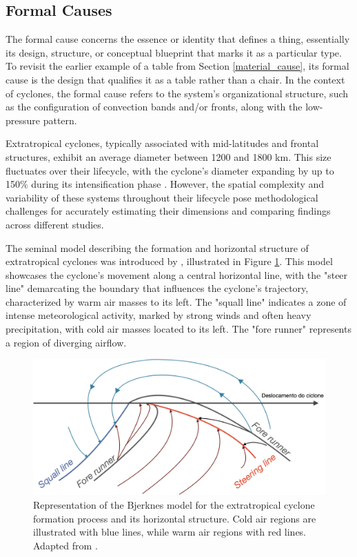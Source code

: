 \subsection{Formal Causes}\label{formal_cause}

The formal cause concerns the essence or identity that defines a thing, essentially its design, structure, or conceptual blueprint that marks it as a particular type. To revisit the earlier example of a table from Section \ref{material_cause}, its formal cause is the design that qualifies it as a table rather than a chair. In the context of cyclones, the formal cause refers to the system's organizational structure, such as the configuration of convection bands and/or fronts, along with the low-pressure pattern.

Extratropical cyclones, typically associated with mid-latitudes and frontal structures, exhibit an average diameter between 1200 and 1800 km. This size fluctuates over their lifecycle, with the cyclone's diameter expanding by up to 150\% during its intensification phase \citep{simmonds2000size, rudeva2007climatology}. However, the spatial complexity and variability of these systems throughout their lifecycle pose methodological challenges for accurately estimating their dimensions and comparing findings across different studies.

The seminal model describing the formation and horizontal structure of extratropical cyclones was introduced by \citet{bjerknes1919structure}, illustrated in Figure \ref{bjerknes_cyclone}. This model showcases the cyclone's movement along a central horizontal line, with the "steer line" demarcating the boundary that influences the cyclone's trajectory, characterized by warm air masses to its left. The "squall line" indicates a zone of intense meteorological activity, marked by strong winds and often heavy precipitation, with cold air masses located to its left. The "fore runner" represents a region of diverging airflow.

\begin{figure}[h]
\begin{center}
\setcaptionmargin{1cm}
\includegraphics[width=0.7\columnwidth,angle=0]{fig/bjerknes_ciclone.png}
\caption[Bjerknes Cyclone Model]{Representation of the Bjerknes model for the extratropical cyclone formation process and its horizontal structure. Cold air regions are illustrated with blue lines, while warm air regions with red lines. Adapted from \citet{bjerknes1919structure}.} 
\label{bjerknes_cyclone}
\end{center}
\end{figure}

